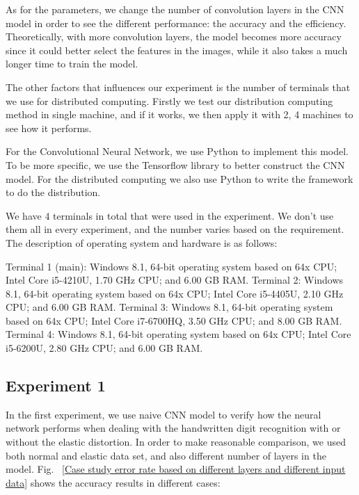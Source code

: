 As for the parameters, we change the number of convolution layers in the CNN model in order to see the different performance: the accuracy and the efficiency. Theoretically, with more convolution layers, the model becomes more accuracy since it could better select the features in the images, while it also takes a much longer time to train the model.

The other factors that influences our experiment is the number of terminals that we use for distributed computing.  Firstly we test our distribution computing method in single machine, and if it works, we then apply it with 2, 4 machines to see how it performs.


For the Convolutional Neural Network, we use Python to implement this model. To be more specific, we use the Tensorflow library to better construct the CNN model. For the distributed computing we also use Python to write the framework to do the distribution.

We have 4 terminals in total that were used in the experiment. We don't use them all in every experiment, and the number varies based on the requirement. The description of operating system and hardware is as follows:

Terminal 1 (main): Windows 8.1, 64-bit operating system based on 64x CPU; Intel Core i5-4210U, 1.70 GHz CPU; and 6.00 GB RAM.  Terminal 2: Windows 8.1, 64-bit operating system based on 64x CPU; Intel Core i5-4405U, 2.10 GHz CPU; and 6.00 GB RAM.  Terminal 3: Windows 8.1, 64-bit operating system based on 64x CPU; Intel Core i7-6700HQ, 3.50 GHz CPU; and 8.00 GB RAM.  Terminal 4: Windows 8.1, 64-bit operating system based on 64x CPU; Intel Core i5-6200U, 2.80 GHz CPU; and 6.00 GB RAM.


\subsection{Experiment 1}
\label{subsec:Exp1}

In the first experiment, we use naive CNN model to verify how the neural network performs when dealing with the handwritten digit recognition with or without the elastic distortion. In order to make reasonable comparison, we used both normal and elastic data set, and also different number of layers in the model. Fig. ~\ref{Case study error rate based on different layers and different input data} shows the accuracy results in different cases:

